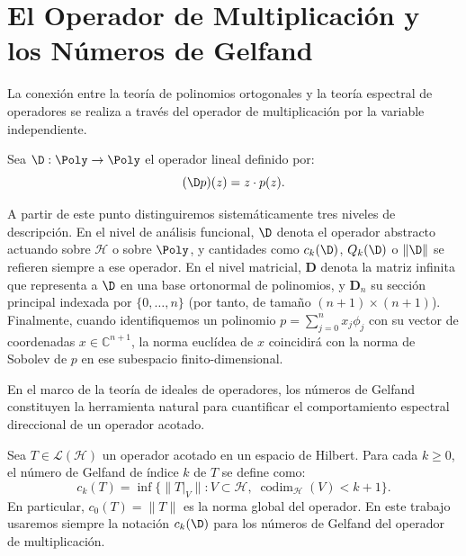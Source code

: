 \section{El Operador de Multiplicación y los Números de Gelfand}

La conexión entre la teoría de polinomios ortogonales y la teoría espectral de operadores se realiza a través del operador de multiplicación por la variable independiente.

\begin{defn} \label{def:operador_multiplicacion}
	Sea $\D: \Poly \to \Poly$ el operador lineal definido por:
	\begin{equation}
		(\D p)(z) = z \cdot p(z).
	\end{equation}
\end{defn}

\begin{rmk}
	A partir de este punto distinguiremos sistemáticamente tres niveles de descripción. En el nivel de análisis funcional, $\D$ denota el operador abstracto actuando sobre $\mathcal{H}$ o sobre $\Poly$, y cantidades como $c_k(\D)$, $Q_k(\D)$ o $\|\D\|$ se refieren siempre a ese operador. En el nivel matricial, $\mathbf{D}$ denota la matriz infinita que representa a $\D$ en una base ortonormal de polinomios, y $\mathbf{D}_n$ su sección principal indexada por $\{0,\dots,n\}$ (por tanto, de tamaño $(n+1)\times(n+1)$). Finalmente, cuando identifiquemos un polinomio $p = \sum_{j=0}^{n} x_j \phi_j$ con su vector de coordenadas $x \in \mathbb{C}^{n+1}$, la norma euclídea de $x$ coincidirá con la norma de Sobolev de $p$ en ese subespacio finito-dimensional.
\end{rmk}

En el marco de la teoría de ideales de operadores, los números de Gelfand constituyen la herramienta natural para cuantificar el comportamiento espectral direccional de un operador acotado.

\begin{defn}\label{def:numeros_gelfand}
	Sea $T \in \mathcal{L}(\mathcal{H})$ un operador acotado en un espacio de Hilbert. Para cada $k\ge 0$, el número de Gelfand de índice $k$ de $T$ se define como:
	\begin{equation}
		c_k(T) = \inf \{ \|T|_V\| : V \subset \mathcal{H}, \; \operatorname{codim}_{\mathcal{H}}(V) < k+1 \}.
	\end{equation}
	En particular, $c_0(T) = \|T\|$ es la norma global del operador. En este trabajo usaremos siempre la notación $c_k(\D)$ para los números de Gelfand del operador de multiplicación.
\end{defn}

